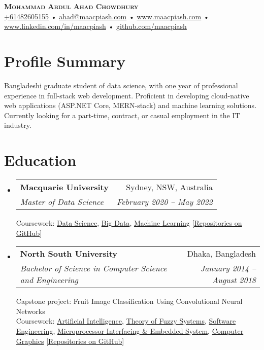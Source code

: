 \documentclass[a4-paper,10pt]{article}
\makeatletter
\newcommand{\resumeSubheading}[4]{
  \vspace{-1pt}\item
    \begin{tabular*}{0.97\textwidth}[t]{l@{\extracolsep{\fill}}r}
      \textbf{#1} & #2 \\
      \textit{#3} & \textit{ #4} \\
    \end{tabular*}\vspace{-5pt}
}
\newcommand{\resumeSubHeadingListStart}{\begin{itemize}[leftmargin=*]}
\newcommand{\resumeSubHeadingListEnd}{\end{itemize}}
\makeatother
\begin{document}
\begin{center}
    \textbf{\Huge \scshape Mohammad Abdul Ahad Chowdhury} \\ \vspace{2pt}
    \small
    {
        \href{tel:+61482605155}{+61482605155} • \href{mailto:ahad@maacpiash.com}{ahad@maacpiash.com} •
        \href{https://www.maacpiash.com}{www.maacpiash.com} • 
        \href{https://www.linkedin.com/in/maacpiash}{www.linkedin.com/in/maacpiash} •
        \href{https://github.com/maacpiash}{github.com/maacpiash}
    }
\end{center}

\section{Profile Summary}
Bangladeshi graduate student of data science, with one year of professional experience in full-stack web development. Proficient in developing cloud-native web applications (ASP.NET Core, MERN-stack) and machine learning solutions. Currently looking for a part-time, contract, or casual employment in the IT industry.


\section{Education}
  \resumeSubHeadingListStart
    \resumeSubheading
      {Macquarie University}{Sydney, NSW, Australia}
      {Master of Data Science}{February 2020 -- May 2022}

      Coursework: \href{https://github.com/maacpiash/COMP6200}{Data Science}, \href{https://github.com/maacpiash/COMP6210}{Big Data}, \href{https://github.com/maacpiash/COMP8220}{Machine Learning} [\href{https://github.com/maacpiash?tab=repositories&q=COMP}{\underline{Repositories on GitHub}}]
      
    \resumeSubheading
      {North South University}{Dhaka, Bangladesh}
      {Bachelor of Science in Computer Science and Engineering}{January 2014 -- August 2018}
      
      Capstone project: Fruit Image Classification Using Convolutional Neural Networks \\
      Coursework: \href{https://github.com/maacpiash/CSE440}{Artificial Intelligence}, \href{https://github.com/maacpiash/CSE470}{Theory of Fuzzy Systems}, \href{https://github.com/maacpiash/CSE327}{Software Engineering}, \href{https://github.com/maacpiash/CSE331}{Microprocessor Interfacing \& Embedded System}, \href{https://github.com/maacpiash/SpaceShooter}{Computer Graphics}
      [\href{https://github.com/maacpiash?tab=repositories&q=CSE}{\underline{Repositories on GitHub}}]
  \resumeSubHeadingListEnd
\end{document}
